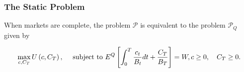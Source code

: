 \documentclass[\topdir/lecture\_notes.tex]{subfiles}
\begin{document}
\subsubsection{The Static Problem}
\begin{proposition}\label{prop:complete_markets_equivalence}
When markets are complete, the problem \(\mathcal{P}\) is equivalent to the problem \(\mathcal{P}_{Q}\) given by

\begin{equation}
\max _{c, C_{T}} U\left(c, C_{T}\right), \quad \text { subject to } \\
E^{Q}\left[\int_{0}^{T} \frac{c_{t}}{B_{t}} d t+\frac{C_{T}}{B_{T}}\right]=W,  \label{eq:6.5.16}\\
c \geq 0, \quad C_{T} \geq 0 .
\end{equation}
\end{proposition}
\end{document}
